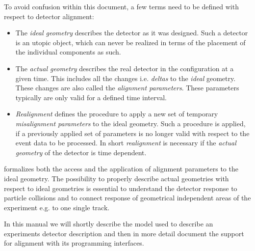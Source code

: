\documentclass[10pt,a4paper]{article}
\begin{document}
\noindent
To avoid confusion within this document, a few terms need to be defined
with respect to detector alignment:
\begin{itemize}\itemcompact
\item The {\it{ideal geometry}} describes the detector as it was designed.
    Such a detector is an utopic object, which can never be realized in terms
    of the placement of the individual components as such.
\item The {\it{actual geometry}} describes the real detector in the configuration at
    a given time. This includes all the changes i.e. {\it{deltas}} to the 
    {\it{ideal}} geometry. These changes are also called the 
    {\it{alignment parameters}}. These parameters typically are only valid 
    for a defined time interval.
\item {\it{Realignment}} defines the procedure to apply a new set of
    temporary {\it{misalignment parameters}} to the ideal geometry. Such a procedure
    is applied, if a previously applied set of parameters is no longer valid with
    respect to the event data to be processed. In short {\it{realignment}}
    is necessary if the {\it{actual geometry}} of the detector is time dependent.
\end{itemize}

\noindent
\DDA formalizes both the access and the application of alignment parameters 
to the ideal geometry. The possibility to properly describe actual geometries 
with respect to ideal geometries is essential to understand the detector response
to particle collisions and to connect response of geometrical independent
areas of the experiment e.g. to one single track.

\noindent
In this manual we will shortly describe the model used
to describe an experiments detector description and then in more detail 
document the support for alignment with its programming interfaces.
\end{document}
